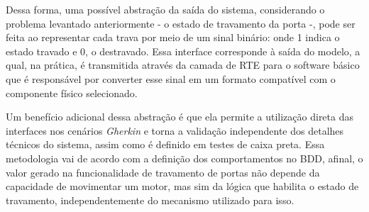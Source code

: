 Dessa forma, uma possível abstração da saída do sistema, considerando o problema levantado anteriormente - o estado de travamento da porta -, pode ser feita ao 
representar cada trava por meio de um sinal binário: onde 1 indica o estado travado e 0, o destravado. Essa interface corresponde à saída do modelo, a qual, na 
prática, é transmitida através da camada de RTE para o software básico que é responsável por converter esse sinal em um formato compatível com o componente físico 
selecionado.

Um benefício adicional dessa abstração é que ela permite a utilização direta das interfaces nos cenários \textit{Gherkin} e torna a validação independente dos detalhes 
técnicos do sistema, assim como é definido em testes de caixa preta. Essa metodologia vai de acordo com a definição dos comportamentos no BDD, afinal, o valor 
gerado na funcionalidade de travamento de portas não depende da capacidade de movimentar um motor, mas sim da lógica que habilita o estado de travamento, 
independentemente do mecanismo utilizado para isso.